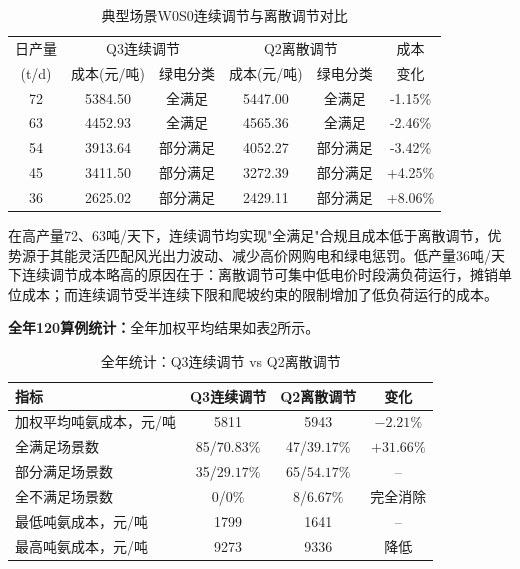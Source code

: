 \documentclass[zihao=-4,a4paper]{ctexart} %
\begin{document}
	\begin{table}[ht]
		\centering
		\caption{典型场景W0S0连续调节与离散调节对比}
		\label{tab:q3_typical}
		\begin{tabular}{cccccc}
			\toprule
			日产量 & \multicolumn{2}{c}{Q3连续调节} & \multicolumn{2}{c}{Q2离散调节} & 成本 \\
			(t/d) & 成本(元/吨) & 绿电分类 & 成本(元/吨) & 绿电分类 & 变化 \\
			\midrule
			72 & 5384.50 & 全满足 & 5447.00 & 全满足 & -1.15\% \\
			63 & 4452.93 & 全满足 & 4565.36 & 全满足 & -2.46\% \\
			54 & 3913.64 & 部分满足 & 4052.27 & 部分满足 & -3.42\% \\
			45 & 3411.50 & 部分满足 & 3272.39 & 部分满足 & +4.25\% \\
			36 & 2625.02 & 部分满足 & 2429.11 & 部分满足 & +8.06\% \\
			\bottomrule
		\end{tabular}
	\end{table}
	
	在高产量72、63吨/天下，连续调节均实现"全满足"合规且成本低于离散调节，优势源于其能灵活匹配风光出力波动、减少高价网购电和绿电惩罚。低产量36吨/天下连续调节成本略高的原因在于：离散调节可集中低电价时段满负荷运行，摊销单位成本；而连续调节受半连续下限和爬坡约束的限制增加了低负荷运行的成本。
	
	\textbf{全年120算例统计：}全年加权平均结果如表\ref{tab:q3_annual}所示。
	
	\begin{table}[ht]
		\centering
		\caption{全年统计：Q3连续调节 vs Q2离散调节}
		\label{tab:q3_annual}
		\begin{tabular}{lccc}
			\toprule
			指标 & Q3连续调节 & Q2离散调节 & 变化 \\
			\midrule
			加权平均吨氨成本，元/吨 & 5811 & 5943 & $-2.21\%$ \\
			全满足场景数 & 85/$70.83\%$ & 47/$39.17\%$ & $+31.66\%$ \\
			部分满足场景数 & 35/$29.17\%$ & 65/$54.17\%$ & -- \\
			全不满足场景数 & 0/$0\%$ & 8/$6.67\%$ & 完全消除 \\
			最低吨氨成本，元/吨 & 1799 & 1641 & -- \\
			最高吨氨成本，元/吨 & 9273 & 9336 & 降低 \\
			\bottomrule
		\end{tabular}
	\end{table}
	
\end{document}
